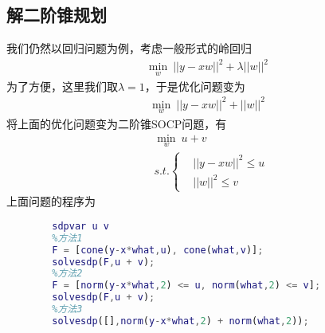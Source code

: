     \subsection{解二阶锥规划}
        \par
        我们仍然以回归问题为例，考虑一般形式的岭回归
        \begin{align*}
        \min_w \ ||y - xw||^2 + \lambda||w||^2
        \end{align*}
        为了方便，这里我们取$\lambda = 1$，于是优化问题变为
        \begin{align*}
        \min_w \ ||y - xw||^2 + ||w||^2
        \end{align*}
        将上面的优化问题变为二阶锥SOCP问题，有
        \begin{align*}
        &\min_w  \ u+v\\
        &s.t.\left\{
        \begin{aligned}
        &||y-xw||^2 \leqslant u\\
        &||w||^2 \leqslant v
        \end{aligned}
        \right.
        \end{align*}
        上面问题的程序为
        \begin{lstlisting}[language = Matlab]
        %% 二阶锥规划--线性回归示例
        sdpvar u v
        %方法1
        F = [cone(y-x*what,u), cone(what,v)];
        solvesdp(F,u + v);
        %方法2
        F = [norm(y-x*what,2) <= u, norm(what,2) <= v];
        solvesdp(F,u + v);
        %方法3
        solvesdp([],norm(y-x*what,2) + norm(what,2));
        \end{lstlisting}
